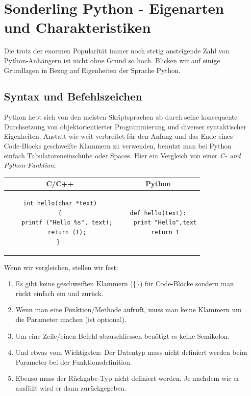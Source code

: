 \documentclass[b5paper,10pt,dvips,fleqn,titlepage,twoside]{book}
\begin{document}
\section{Sonderling Python - Eigenarten und Charakteristiken}
Die trotz der enormen Popularität immer noch stetig ansteigende Zahl von Python-Anhängern ist nicht ohne Grund so hoch.
Blicken wir auf einige Grundlagen in Bezug auf Eigenheiten der Sprache Python.
\subsection{Syntax und Befehlszeichen}
Python hebt sich von den meisten Skriptsprachen ab durch seine konsequente Durchsetzung von objektorientierter Programmierung und diverser syntaktischer Eigenheiten.
Anstatt wie weit verbreitet für den Anfang und das Ende eines Code-Blocks geschweifte Klammern zu verwenden, benutzt man bei Python einfach Tabulatoreneinschübe oder Spaces.
Hier ein Vergleich von einer \emph{C- und Python-Funktion}:
\begin{center}
\begin{tabular}[p]{|c|c|}
\hline
C/C++ & Python\\\hline
\begin{lstlisting}
int hello(char *text)
{
	printf ("Hello %s", text);
	return (1);
} 
\end{lstlisting}
 & 
\begin{lstlisting}
def hello(text):
	print "Hello",text
	return 1
\end{lstlisting}
\\\hline
\end{tabular}
\end{center}

Wenn wir vergleichen, stellen wir fest:
\begin{enumerate}
 \item Es gibt keine geschweiften Klammern (\{\}) für Code-Blöcke sondern man rückt einfach ein und zurück.
 \item Wenn man eine Funktion/Methode aufruft, muss man keine Klammern um die Parameter machen (ist optional).
 \item Um eine Zeile/einen Befehl abzuschliessen benötigt es keine Semikolon.
 \item Und etwas vom Wichtigsten: Der Datentyp muss nicht definiert werden beim Parameter bei der Funktionsdefinition.
 \item Ebenso muss der Rückgabe-Typ nicht definiert werden. Je nachdem wie er ausfällt wird er dann zurückgegeben.
\end{enumerate}
\end{document}
